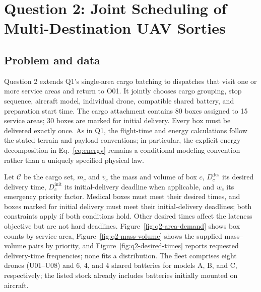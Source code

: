 \section{Question 2: Joint Scheduling of Multi-Destination UAV Sorties}
\subsection{Problem and data}
Question 2 extends Q1's single-area cargo batching to dispatches that visit one or more service areas and return to O01. It jointly chooses cargo grouping, stop sequence, aircraft model, individual drone, compatible shared battery, and preparation start time. The cargo attachment contains 80 boxes assigned to 15 service areas; 30 boxes are marked for initial delivery. Every box must be delivered exactly once. As in Q1, the flight-time and energy calculations follow the stated terrain and payload conventions; in particular, the explicit energy decomposition in Eq.~\eqref{eq:energy} remains a conditional modeling convention rather than a uniquely specified physical law.

Let $\mathcal C$ be the cargo set, $m_c$ and $v_c$ the mass and volume of box $c$, $D_c^{\mathrm{des}}$ its desired delivery time, $D_c^{\mathrm{init}}$ its initial-delivery deadline when applicable, and $w_c$ its emergency priority factor. Medical boxes must meet their desired times, and boxes marked for initial delivery must meet their initial-delivery deadlines; both constraints apply if both conditions hold. Other desired times affect the lateness objective but are not hard deadlines. Figure~\ref{fig:q2-area-demand} shows box counts by service area, Figure~\ref{fig:q2-mass-volume} shows the supplied mass--volume pairs by priority, and Figure~\ref{fig:q2-desired-times} reports requested delivery-time frequencies; none fits a distribution. The fleet comprises eight drones (U01--U08) and 6, 4, and 4 shared batteries for models A, B, and C, respectively; the listed stock already includes batteries initially mounted on aircraft.

